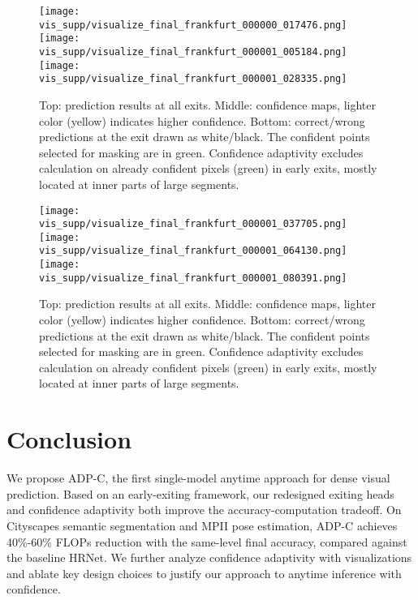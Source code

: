 \begin{figure}[!htbp]
\texttt{[image: vis\_supp/visualize\_final\_frankfurt\_000000\_017476.png]}
\texttt{[image: vis\_supp/visualize\_final\_frankfurt\_000001\_005184.png]}
\texttt{[image: vis\_supp/visualize\_final\_frankfurt\_000001\_028335.png]}
\caption{%
Top: prediction results at all exits.
Middle: confidence maps, lighter color (yellow) indicates higher confidence.
Bottom: correct/wrong predictions at the exit drawn as white/black.
The confident points selected for masking are in green.
Confidence adaptivity excludes calculation on already confident pixels (green) in early exits, mostly located at inner parts of large segments.}
\label{fig:vis1}
\end{figure}

\begin{figure}[!htbp]
\texttt{[image: vis\_supp/visualize\_final\_frankfurt\_000001\_037705.png]}
\texttt{[image: vis\_supp/visualize\_final\_frankfurt\_000001\_064130.png]}
\texttt{[image: vis\_supp/visualize\_final\_frankfurt\_000001\_080391.png]}
\caption{%
Top: prediction results at all exits.
Middle: confidence maps, lighter color (yellow) indicates higher confidence.
Bottom: correct/wrong predictions at the exit drawn as white/black.
The confident points selected for masking are in green.
Confidence adaptivity excludes calculation on already confident pixels (green) in early exits, mostly located at inner parts of large segments.}
\label{fig:vis2}
\end{figure}


\section{Conclusion}
We propose ADP-C, the first single-model anytime approach for dense visual prediction.
Based on an early-exiting framework, our redesigned exiting heads and confidence adaptivity both improve the accuracy-computation tradeoff.
On Cityscapes semantic segmentation and MPII pose estimation, ADP-C achieves 40\%-60\% FLOPs reduction with the same-level final accuracy, compared against the baseline HRNet.
We further analyze confidence adaptivity with visualizations and ablate key design choices to justify our approach to anytime inference with confidence.
